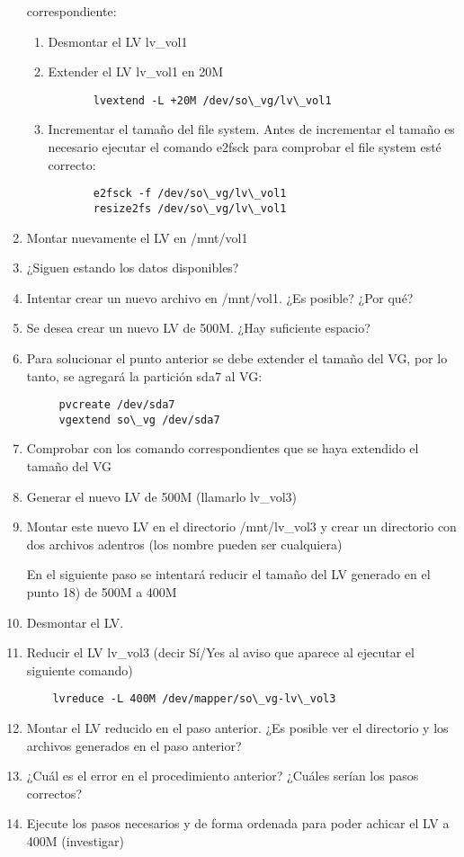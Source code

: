\begin{enumerate}
   correspondiente:
 \begin{enumerate}
  \item Desmontar el LV lv\_vol1
  \item Extender el LV lv\_vol1 en 20M
    \begin{verbatim} 
       lvextend -L +20M /dev/so\_vg/lv\_vol1
    \end{verbatim}
  \item Incrementar el tamaño del file system. Antes de incrementar el tamaño es necesario ejecutar el comando e2fsck
    para comprobar el file system esté correcto:
     \begin{verbatim}
       e2fsck -f /dev/so\_vg/lv\_vol1 
       resize2fs /dev/so\_vg/lv\_vol1	
     \end{verbatim}
 \end{enumerate}
 \item Montar nuevamente el LV en /mnt/vol1
 \item ¿Siguen estando los datos disponibles?
 \item Intentar crear un nuevo archivo en /mnt/vol1. ¿Es posible? ¿Por qué?
 \item Se desea crear un nuevo LV de 500M. ¿Hay suficiente espacio? 
 \item Para solucionar el punto anterior se debe extender el tamaño del VG, por lo tanto, se agregará la partición sda7 al VG:
   \begin{verbatim}
     pvcreate /dev/sda7
     vgextend so\_vg /dev/sda7
   \end{verbatim}
 \item Comprobar con los comando correspondientes que se haya extendido el tamaño del VG
 \item Generar el nuevo LV de 500M (llamarlo lv\_vol3)
 \item Montar este nuevo LV en el directorio /mnt/lv\_vol3 y crear un directorio con dos archivos adentros (los nombre pueden ser cualquiera)
 
 En el siguiente paso se intentará reducir el tamaño del LV generado en el punto 18) de 500M a 400M

 \item Desmontar el LV.  
 \item Reducir el LV lv\_vol3 (decir Sí/Yes al aviso que aparece al ejecutar el siguiente comando)
  \begin{verbatim}
    lvreduce -L 400M /dev/mapper/so\_vg-lv\_vol3
  \end{verbatim}
 \item Montar el LV reducido en el paso anterior. ¿Es posible ver el directorio y los archivos generados en el paso anterior?
 \item ¿Cuál es el error en el procedimiento anterior? ¿Cuáles serían los pasos correctos? 
 \item Ejecute los pasos necesarios y de forma ordenada para poder achicar el LV a 400M (investigar)
\end{enumerate}

